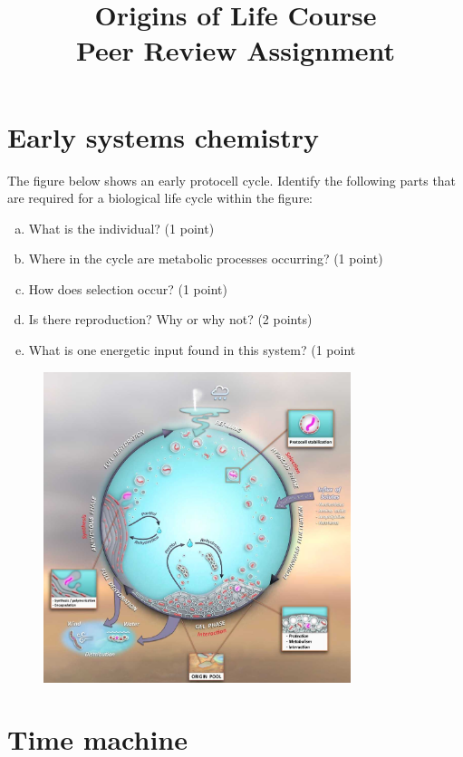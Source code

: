 \documentclass[]{article}
\title{
	Origins of Life Course\\
	Peer Review Assignment
}
\begin{document}
\maketitle

\tableofcontents

\section{Early systems chemistry}

The figure below shows an early protocell cycle. Identify the following parts that are
required for a biological life cycle within the figure:
\begin{enumerate}[(a)]
	\item What is the individual? (1 point)
	\item Where in the cycle are metabolic processes occurring? (1 point)
	\item How does selection occur? (1 point)
	\item Is there reproduction? Why or why not? (2 points)
	\item What is one energetic input found in this system? (1 point
\end{enumerate}
\begin{figure}[H]
	\caption{\cite{damer2016field}}
	\includegraphics[width=0.8\textwidth]{WarmLittlePond}
\end{figure}
\section{Time machine}
\end{document}
